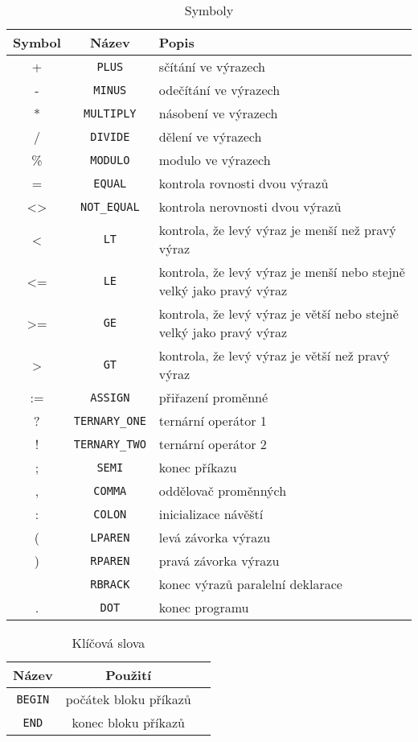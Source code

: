 \documentclass[
12pt,
a4paper,
pdftex,
czech
]{report}
\begin{document}
\begin{longtable}{|c|c|p{10cm}|}
\centering
\caption{Symboly}
\label{symboly}
\endfirsthead
\endhead
\hline
		\textbf{Symbol} & \textbf{Název} & \textbf{Popis} \\
\hline
+ & \texttt{PLUS} & sčítání ve výrazech \\ \hline
- & \texttt{MINUS} & odečítání ve výrazech \\ \hline
* & \texttt{MULTIPLY} & násobení ve výrazech \\ \hline
/ & \texttt{DIVIDE} & dělení ve výrazech \\ \hline
\% & \texttt{MODULO} & modulo ve výrazech \\ \hline
= & \texttt{EQUAL} &  kontrola rovnosti dvou výrazů \\ \hline
<> & \texttt{NOT\_EQUAL} & kontrola nerovnosti dvou výrazů \\ \hline
< & \texttt{LT} & kontrola, že levý výraz je menší než pravý výraz \\ \hline
<= & \texttt{LE} & kontrola, že levý výraz je menší nebo stejně velký jako pravý výraz \\ \hline
>= & \texttt{GE} & kontrola, že levý výraz je větší nebo stejně velký jako pravý výraz \\ \hline
> & \texttt{GT} & kontrola, že levý výraz je větší než pravý výraz \\ \hline
:= & \texttt{ASSIGN} & přiřazení proměnné \\ \hline
? & \texttt{TERNARY\_ONE} & ternární operátor 1 \\ \hline
! & \texttt{TERNARY\_TWO} & ternární operátor 2 \\ \hline
; & \texttt{SEMI} & konec příkazu \\ \hline
, & \texttt{COMMA} & oddělovač proměnných \\ \hline
: & \texttt{COLON} & inicializace návěští \\ \hline
( & \texttt{LPAREN} & levá závorka výrazu \\ \hline
) & \texttt{RPAREN} & pravá závorka výrazu \\ \hline
[ & \texttt{LBRACK} & počátek výrazů paralelní deklarace \\ \hline
] & \texttt{RBRACK} & konec výrazů paralelní deklarace \\ \hline
. & \texttt{DOT} & konec programu \\ \hline
\end{longtable}


\begin{longtable}{|c|c|p{10cm}|}
\caption{Klíčová slova}
\label{slova}
\endfirsthead
\endhead
\hline
		\textbf{Název} &\textbf{Použití} \\
\hline
\texttt{BEGIN} & počátek bloku příkazů \\ \hline
\texttt{END} & konec bloku příkazů \\ \hline
\end{longtable}
\end{document}
